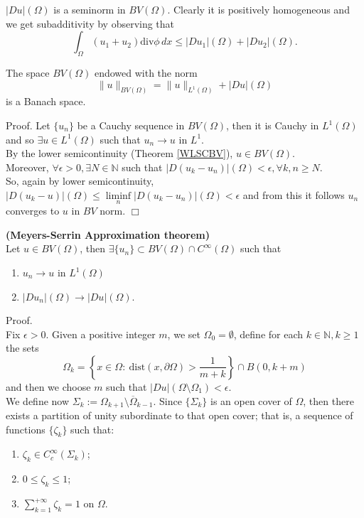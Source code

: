 \begin{remark} $|Du|(\Omega)$ is a seminorm in $BV(\Omega)$. Clearly it is positively homogeneous and we get subadditivity by observing that 
\[ \int_{\Omega} (u_{1} + u_{2})\mathrm{div}\phi \, dx \le |Du_{1}|(\Omega) + |Du_{2}|(\Omega). \]
\end{remark}

\begin{theorem} The space $BV(\Omega)$ endowed with the norm 
\[ \|u\|_{BV(\Omega)} = \|u\|_{L^{1}(\Omega)} + |Du|(\Omega)\]
is a Banach space.
\end{theorem}

Proof. Let $\{u_{n}\}$ be a Cauchy sequence in $BV(\Omega)$, then it is Cauchy in $L^{1}(\Omega)$ and so $\exists u \in L^{1}(\Omega)$ such that $u_{n} \to u$ in $L^{1}$. 
\\
By the lower semicontinuity (Theorem \ref{WLSCBV}), $u \in BV(\Omega)$.
\\
Moreover, $\forall \epsilon > 0, \exists N \in \mathbb{N}$ such that $|D(u_{k} - u_{n})|(\Omega) < \epsilon, \forall k, n \ge N$.
\\    
So, again by lower semicontinuity, $|D(u_{k} - u)|(\Omega) \le \liminf\limits_{n} |D(u_{k} - u_{n})|(\Omega) < \epsilon$ and from this it follows $u_{n}$ converges to $u$ in $BV$ norm.       $\Box$

\begin{theorem} \label{Meyers-SerrinBV} {\bf (Meyers-Serrin Approximation theorem)} 
\\
Let $u \in BV(\Omega)$, then $\exists \{u_{n}\} \subset BV(\Omega) \cap C^{\infty}(\Omega)$ such that 
\begin{enumerate}
	\item $u_{n} \to u$ in $L^{1}(\Omega)$
	\item $|Du_{n}|(\Omega) \to |Du|(\Omega)$.
\end{enumerate}
\end{theorem}

Proof. 
\\
Fix $\epsilon > 0$. Given a positive integer $m$, we set $\Omega_{0} = \emptyset$, define for each $k \in \mathbb{N}, k \ge 1$ the sets
\[ \Omega_{k} = \left \{ x \in \Omega : \ \mathrm{dist}(x, \partial \Omega) > \frac{1}{m + k} \right \} \cap B(0, k + m) \]
and then we choose $m$ such that $|Du|(\Omega \setminus \Omega_{1}) < \epsilon$. 
\\
We define now $\Sigma_{k} := \Omega_{k+1} \setminus \overline \Omega_{k-1}$. Since $\{\Sigma_{k}\}$ is an open cover of $\Omega$, then there exists a partition of unity subordinate to that open cover; that is, a sequence of functions $\{\zeta_{k}\}$ such that:
\begin{enumerate}
	\item $\zeta_{k} \in C^{\infty}_{c}(\Sigma_{k})$;
	\item $0 \le \zeta_{k} \le 1$;
	\item $\sum_{k = 1}^{+\infty} \zeta_{k} = 1$ on $\Omega$.
\end{enumerate}

